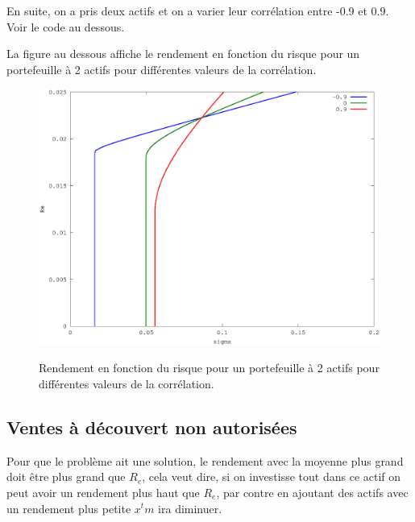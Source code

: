 \documentclass[a4paper,11pt]{article}
\begin{document}
En suite, on a pris deux actifs et on a varier leur corrélation entre -0.9 et 0.9. Voir le code au dessous.

\begin{multicols}{2}
  
\end{multicols}


La  figure au dessous affiche le  rendement en fonction du  risque pour un
portefeuille à 2 actifs pour différentes valeurs de la corrélation.

\begin{figure}[h!]
  \begin{centering}
    \includegraphics[scale=0.4]{rho.eps}
    \label{rspro2}
    \par\end{centering}
  \caption{Rendement en fonction du risque pour un portefeuille à 2 actifs pour différentes valeurs de la corrélation.}
  \label{fig:jacobi-conv}
\end{figure}

\newpage

\subsection{Ventes à découvert non autorisées}
Pour que le  problème ait une solution, le rendement avec  la moyenne plus grand
doit être plus  grand que $R_e$, cela  veut dire, si on investisse  tout dans ce
actif on peut avoir un rendement plus haut que $R_e$, par contre en ajoutant des
actifs avec un rendement plus petite $x^tm$ ira diminuer.
\end{document}
